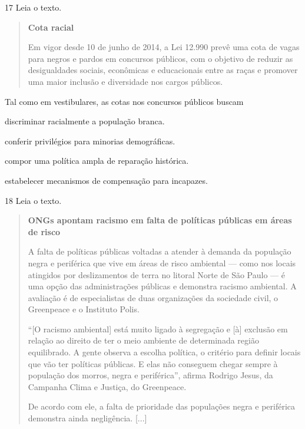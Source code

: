\num{17} Leia o texto.

\begin{quote}
\textbf{Cota racial}

Em vigor desde 10 de junho de 2014, a Lei 12.990 prevê uma cota de vagas para negros e pardos em concursos públicos, com o objetivo de reduzir as desigualdades sociais, econômicas e educacionais entre as raças e promover uma maior inclusão e diversidade nos cargos públicos.

\end{quote}

Tal como em vestibulares, as cotas nos concursos públicos buscam

\begin{escolha}
\item  discriminar racialmente a população branca.

\item  conferir privilégios para minorias demográficas.

\item  compor uma política ampla de reparação histórica.

\item  estabelecer mecanismos de compensação para incapazes.
\end{escolha}


\num{18} Leia o texto.

\begin{quote}
\textbf{ONGs apontam racismo em falta de políticas públicas em áreas de risco}

A falta de políticas públicas voltadas a atender à demanda da população negra e periférica que vive em áreas de risco ambiental –-- como nos locais atingidos por deslizamentos de terra no litoral Norte de São Paulo --- é uma opção das administrações públicas e demonstra racismo ambiental. A avaliação é de especialistas de duas organizações da sociedade civil, o Greenpeace e o Instituto Polis.

``[O racismo ambiental] está muito ligado à segregação e [à] exclusão em relação ao direito de ter o meio ambiente de determinada região equilibrado. A gente observa a escolha política, o critério para definir locais que vão ter políticas públicas. E elas não conseguem chegar sempre à população dos morros, negra e periférica'', afirma Rodrigo Jesus, da Campanha Clima e Justiça, do Greenpeace.

De acordo com ele, a falta de prioridade das populações negra e periférica demonstra ainda negligência. {[}...{]}

\end{quote}


